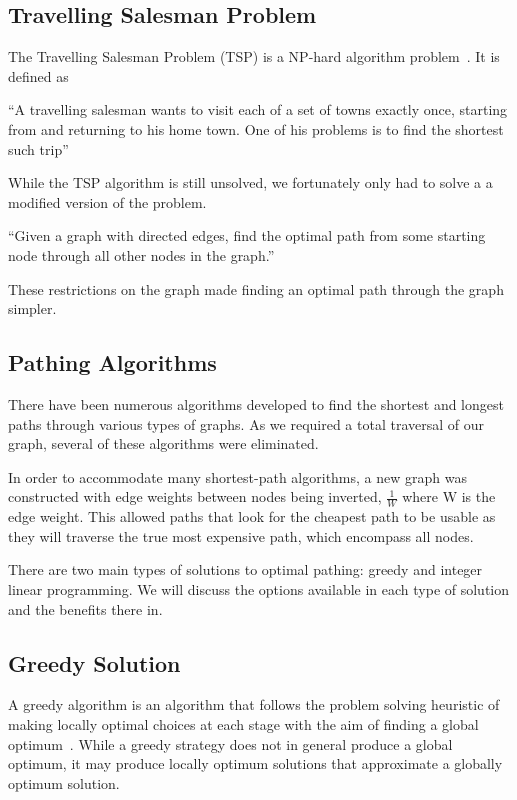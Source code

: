 \documentclass[bsc,frontabs,twoside,singlespacing,parskip,deptreport]{infthesis}     %
\begin{document}
\subsection{Travelling Salesman Problem}
The Travelling Salesman Problem (TSP) is a  NP-hard algorithm problem~\cite{junger1995traveling}.%
It is defined as
\begin{center}
\enquote{A travelling salesman wants to visit each of a set of towns exactly once, starting
from and returning to his home town. One of his problems is to find the shortest
such trip}~\cite{junger1995traveling}
\end{center}

While the TSP algorithm is still unsolved, we fortunately only had to solve a a modified version of the problem.\\

\begin{center}
  \enquote{Given a graph with directed edges, find the optimal path from some starting node through all other nodes in
  the graph.}
\end{center}

These restrictions on the graph made finding an optimal path through the graph simpler.


\subsection{Pathing Algorithms}
There have been numerous algorithms developed to find the shortest and longest paths through various types of graphs.
As we required a total traversal of our graph, several of these algorithms were eliminated.

In order to accommodate many shortest-path algorithms, a new graph was constructed with edge weights between nodes being inverted,
$\frac{1}{W}$ where W is the edge weight. This allowed paths that look for the cheapest path to be usable as they will traverse the
true most expensive path, which encompass all nodes.

There are two main types of solutions to optimal pathing: greedy and integer linear programming.
We will discuss the options available in each type of solution and the benefits there in.

\subsection{Greedy Solution}
A greedy algorithm is an algorithm that follows the problem solving heuristic of making locally optimal choices at each stage with the aim
of finding a global optimum~\cite{devore1996some}.
While a greedy strategy does not in general produce a global optimum, it may produce locally optimum solutions that approximate a globally optimum solution.
\end{document}
